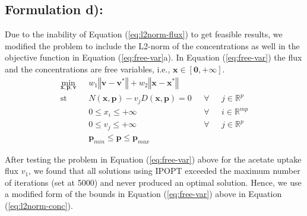\documentclass[10pt]{article}
\begin{document}
	\subsection{Formulation d):}
	Due to the inability of Equation (\ref{eq:l2norm-flux}) to get feasible results, we modified the problem to include the L2-norm of the concentrations as well in the objective function in Equation (\ref{eq:free-var}a). In Equation (\ref{eq:free-var}) the flux and the concentrations are free variables, i.e.,  $\mathbf{x}\in\left[\mathbf{0},+\mathbf{\infty}\right]$. 
	\begin{subequations}\label{eq:free-var}
		\begin{align}
		\underset{\mathbf{x},\mathbf{p},\mathbf{v}}{\mathrm{min}} & \text{      }w_1\left\Vert \mathbf{v}-\mathbf{v}^*\right\Vert + w_2\left\Vert \mathbf{x}-\mathbf{x}^*\right\Vert\\
		\mathrm{st}& \text{      }N(\mathbf{x},\mathbf{p}) - v_jD(\mathbf{x},\mathbf{p}) = 0 & \text{  }\forall & \text{ }j\in\mathbb{R}^p\\
		& \text{      }0\le x_i \le +\infty & \text{  }\forall & \text{ }i\in\mathbb{R}^{mp}\\	
		& \text{      }0\le v_j \le +\infty & \text{  }\forall & \text{ }j\in\mathbb{R}^{p}\\		
		& \text{      }\mathbf{p}_{min} \le \mathbf{p} \le \mathbf{p}_{max}
		\end{align}
	\end{subequations}
	
	After testing the problem in Equation (\ref{eq:free-var}) above for the acetate uptake flux $v_1$, we found that all solutions using IPOPT exceeded the maximum number of iterations (set at 5000) and never produced an optimal solution. Hence, we use a modified form of the bounds in Equation (\ref{eq:free-var}) above in Equation (\ref{eq:l2norm-conc}).
	
	\printbibliography
\end{document}
